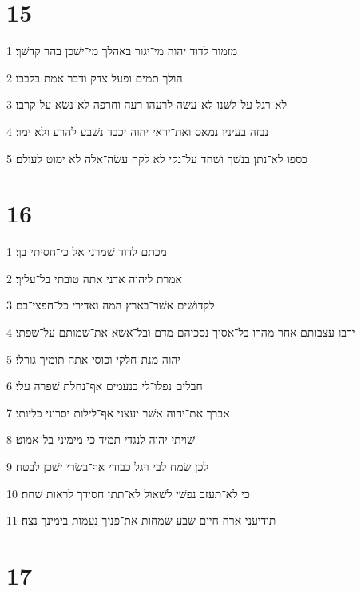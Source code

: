 \chapter{15}

\par 1 מזמור לדוד יהוה מי־יגור באהלך מי־ישׁכן בהר קדשׁך׃
\par 2 הולך תמים ופעל צדק ודבר אמת בלבבו׃
\par 3 לא־רגל על־לשׁנו לא־עשׂה לרעהו רעה וחרפה לא־נשׂא על־קרבו׃
\par 4 נבזה בעיניו נמאס ואת־יראי יהוה יכבד נשׁבע להרע ולא ימר׃
\par 5 כספו לא־נתן בנשׁך ושׁחד על־נקי לא לקח עשׂה־אלה לא ימוט לעולם׃

\chapter{16}

\par 1 מכתם לדוד שׁמרני אל כי־חסיתי בך׃
\par 2 אמרת ליהוה אדני אתה טובתי בל־עליך׃
\par 3 לקדושׁים אשׁר־בארץ המה ואדירי כל־חפצי־בם׃
\par 4 ירבו עצבותם אחר מהרו בל־אסיך נסכיהם מדם ובל־אשׂא את־שׁמותם על־שׂפתי׃
\par 5 יהוה מנת־חלקי וכוסי אתה תומיך גורלי׃
\par 6 חבלים נפלו־לי בנעמים אף־נחלת שׁפרה עלי׃
\par 7 אברך את־יהוה אשׁר יעצני אף־לילות יסרוני כליותי׃
\par 8 שׁויתי יהוה לנגדי תמיד כי מימיני בל־אמוט׃
\par 9 לכן שׂמח לבי ויגל כבודי אף־בשׂרי ישׁכן לבטח׃
\par 10 כי לא־תעזב נפשׁי לשׁאול לא־תתן חסידך לראות שׁחת׃
\par 11 תודיעני ארח חיים שׂבע שׂמחות את־פניך נעמות בימינך נצח׃

\chapter{17}


